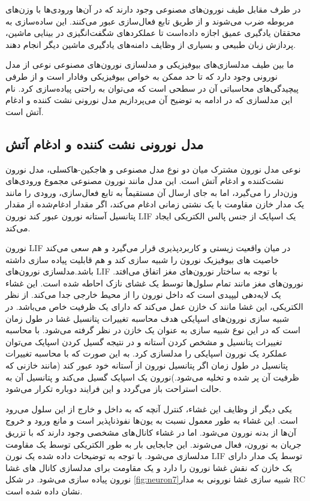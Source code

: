  در طرف مقابل طیف نورون‌های مصنوعی وجود دارند 
که در آن‌ها ورودی‌ها با وزن‌های مربوطه ضرب می‌شوند و از طریق تابع فعال‌سازی عبور می‌کنند. این ساده‌سازی به محققان یادگیری عمیق اجازه داده‌است تا عملکردهای شگفت‌انگیزی در بینایی ماشین، پردازش زبان طبیعی و بسیاری از وظایف دامنه‌های یادگیری ماشین دیگر انجام دهند.

 ما بین طیف مدلسازی‌های بیوفیزیکی و مدلسازی نورون‌های مصنوعی نوعی از مدل نورونی وجود دارد که تا حد ممکن به خواص بیوفیزیکی وفادار است و از طرفی پیچیدگی‌های محاسباتی آن در سطحی است که می‌توان به راحتی پیاده‌سازی کرد. نام این مدلسازی که در ادامه به توضیح آن می‌پردازیم مدل نورونی نشت کننده  و ادغام آتش است.



\subsection{مدل نورونی نشت کننده  و ادغام آتش}
نوعی مدل نورون مشترک میان دو نوع مدل مصنوعی و هاجکین-هاکسلی، مدل نورون نشت‌کننده و ادغام‌ آتش است. این مدل  مانند نورون مصنوعی مجموع ورودی‌های وزن‌دار را می‌گیرد، اما به جای ارسال آن مستقیماً به تابع فعال‌سازی، ورودی را مانند یک مدار خازن مقاومت با یک نشتی زمانی ادغام می‌کند، اگر مقدار ادغام‌شده از مقدار پتانسیل آستانه نورون عبور کند  نورون LIF یک اسپایک از جنس پالس الکتریکی ایجاد می‌کند. 

نورون LIF در میان واقعیت زیستی و کاربرد‌پذیری قرار می‌گیرد و هم سعی می‌کند خاصیت های بیوفیزیک نورون را شبیه سازی کند و هم قابلیت پیاده سازی داشته باشد.مدلسازی نورون‌های LIF با توجه به ساختار نورون‌های مغز اتفاق می‌افتد. نورون‌های مغز مانند تمام سلول‌ها توسط یک غشای نازک احاطه شده است. این غشاء یک لایه‌دهی لیپیدی است که داخل نورون را از محیط خارجی جدا می‌کند. از نظر الکتریکی، این غشا مانند ک خازن عمل می‌کند که دارای یک ظرفیت خاص می‌باشد. در شبیه سازی نورون‌های اسپایکی هدف محاسبه تغییرات پتانسیل غشا در طول زمان است که در این نوع شبیه سازی به عنوان یک خازن در نظر گرفته می‌شود. با محاسبه تغییرات پتانسیل و مشخص کردن آستانه و در نتیجه گسیل کردن اسپایک می‌توان عملکرد یک نورون اسپایکی را مدلسازی کرد. به این صورت که با محاسبه تغییرات پتانسیل در طول زمان اگر پتانسیل نورون از آستانه خود عبور کند (مانند خازنی که ظرفیت آن پر شده و تخلیه می‌شود.)نورون یک اسپایک گسیل می‌کند و پتانسیل آن به حالت استراحت باز می‌گردد و این فرایند دوباره تکرار می‌شود.
\citep{moreno2006auto}

یکی دیگر از وظایف این غشاء، کنترل آنچه که به داخل و خارج از این سلول می‌رود است. این غشاء به طور معمول نسبت به یون‌ها نفوذناپذیر است و مانع ورود و خروج آن‌ها از بدنه نورون می‌شود. اما در غشاء کانال‌های مشخصی وجود دارند که با تزریق جریان به نورون، فعال می‌شوند. این جابجایی بار به طور الکتریکی توسط یک مقاومت مدلسازی می‌شود.
با توجه به توضیحات داده شده یک نورن LIF توسط یک مدار دارای یک خازن که نقش غشا نورون را دارد  و یک مقاومت برای مدلسازی کانال های غشا نورون پیاده سازی می‌شود. در شکل \ref{fig:neuron7}شبیه سازی غشا نورونی به مدار RC نشان داده شده است.

